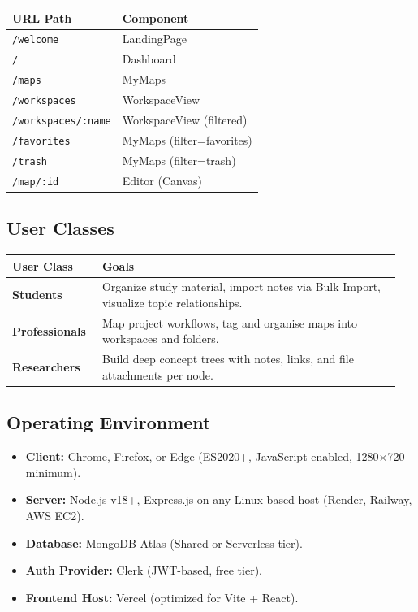 \documentclass[12pt, a4paper]{article}
\begin{document}
\begin{center}
\begin{tabular}{ll}
\toprule
\textbf{URL Path} & \textbf{Component} \\
\midrule
\texttt{/welcome} & LandingPage \\
\texttt{/} & Dashboard \\
\texttt{/maps} & MyMaps \\
\texttt{/workspaces} & WorkspaceView \\
\texttt{/workspaces/:name} & WorkspaceView (filtered) \\
\texttt{/favorites} & MyMaps (filter=favorites) \\
\texttt{/trash} & MyMaps (filter=trash) \\
\texttt{/map/:id} & Editor (Canvas) \\
\bottomrule
\end{tabular}
\end{center}

\subsection{User Classes}
\begin{longtable}{>{\bfseries}p{0.22\linewidth} p{0.73\linewidth}}
\toprule
User Class & Goals \\ \midrule
\endfirsthead
Students & Organize study material, import notes via Bulk Import, visualize topic relationships. \\
Professionals & Map project workflows, tag and organise maps into workspaces and folders. \\
Researchers & Build deep concept trees with notes, links, and file attachments per node. \\
\bottomrule
\end{longtable}

\subsection{Operating Environment}
\begin{itemize}[noitemsep]
  \item \textbf{Client:} Chrome, Firefox, or Edge (ES2020+, JavaScript enabled, 1280×720 minimum).
  \item \textbf{Server:} Node.js v18+, Express.js on any Linux-based host (Render, Railway, AWS EC2).
  \item \textbf{Database:} MongoDB Atlas (Shared or Serverless tier).
  \item \textbf{Auth Provider:} Clerk (JWT-based, free tier).
  \item \textbf{Frontend Host:} Vercel (optimized for Vite + React).
\end{itemize}
\end{document}

